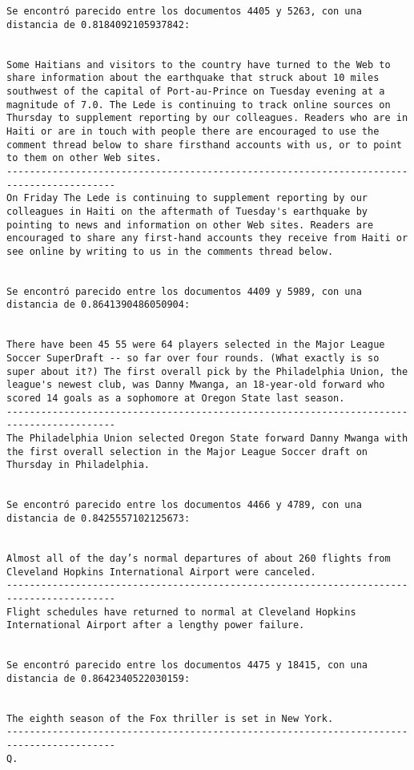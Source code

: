 \documentclass[11pt]{article}
\begin{document}
\begin{Verbatim}[commandchars=\\\{\}]
Se encontró parecido entre los documentos 4405 y 5263, con una distancia de 0.8184092105937842:


Some Haitians and visitors to the country have turned to the Web to share information about the earthquake that struck about 10 miles southwest of the capital of Port-au-Prince on Tuesday evening at a magnitude of 7.0. The Lede is continuing to track online sources on Thursday to supplement reporting by our colleagues. Readers who are in Haiti or are in touch with people there are encouraged to use the comment thread below to share firsthand accounts with us, or to point to them on other Web sites.
-----------------------------------------------------------------------------------------
On Friday The Lede is continuing to supplement reporting by our colleagues in Haiti on the aftermath of Tuesday's earthquake by pointing to news and information on other Web sites. Readers are encouraged to share any first-hand accounts they receive from Haiti or see online by writing to us in the comments thread below.


Se encontró parecido entre los documentos 4409 y 5989, con una distancia de 0.8641390486050904:


There have been 45 55 were 64 players selected in the Major League Soccer SuperDraft -- so far over four rounds. (What exactly is so super about it?) The first overall pick by the Philadelphia Union, the league's newest club, was Danny Mwanga, an 18-year-old forward who scored 14 goals as a sophomore at Oregon State last season.
-----------------------------------------------------------------------------------------
The Philadelphia Union selected Oregon State forward Danny Mwanga with the first overall selection in the Major League Soccer draft on Thursday in Philadelphia.


Se encontró parecido entre los documentos 4466 y 4789, con una distancia de 0.8425557102125673:


Almost all of the day’s normal departures of about 260 flights from Cleveland Hopkins International Airport were canceled.
-----------------------------------------------------------------------------------------
Flight schedules have returned to normal at Cleveland Hopkins International Airport after a lengthy power failure.


Se encontró parecido entre los documentos 4475 y 18415, con una distancia de 0.8642340522030159:


The eighth season of the Fox thriller is set in New York.
-----------------------------------------------------------------------------------------
Q.



\end{Verbatim}
\end{document}
